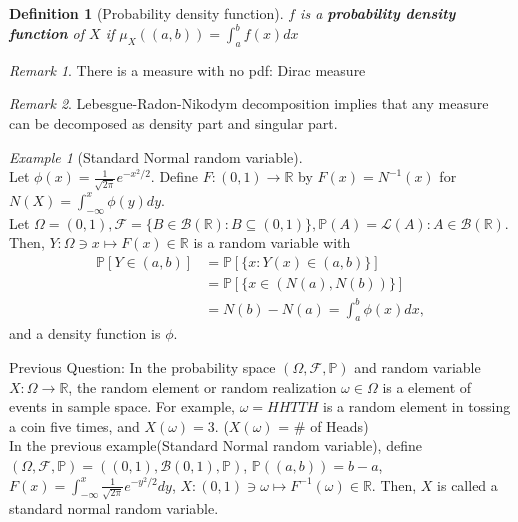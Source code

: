 \documentclass[12pt]{report}
\renewcommand{\subset}{\subseteq}
\theoremstyle{break}
\theoremstyle{newdef}
\newtheorem{defn}[thm]{Definition} %
\theoremstyle{remark}
\newtheorem*{exmp}{Example} %
\newtheorem*{rem}{Remark} %
\begin{document}
\begin{defn}[Probability density function]
$f$ is a \textbf{probability density function} of $X$ if $\mu_X((a,b)) = \int_a^b f(x)dx$
\end{defn}

\begin{rem}
There is a measure with no pdf: Dirac measure
\end{rem}

\begin{rem}
Lebesgue-Radon-Nikodym decomposition implies that any measure can be decomposed as density part and singular part.
\end{rem}

\begin{exmp}[Standard Normal random variable]
\leavevmode\\
Let $\phi(x) = \frac{1}{\sqrt{2\pi}} e^{-x^2/2}$.
Define $F : (0,1) \rightarrow \mathbb{R}$ by $F(x) = N^{-1}(x)$ for $N(X) = \int_{-\infty}^x \phi(y)dy$.\\
Let $\Omega = (0,1), \mathcal{F} = \{B \in \mathcal{B}(\mathbb{R}) : B \subset (0,1)\}, \mathbb{P}(A) = \mathcal{L}(A) : A \in \mathcal{B}(\mathbb{R})$.\\
Then, $Y : \Omega \ni x \mapsto F(x) \in \mathbb{R}$ is a random variable with
$$
\begin{aligned}
\mathbb{P}[Y \in (a,b)]
&= \mathbb{P}[\{x : Y(x) \in (a,b)\}]\\
&= \mathbb{P}[\{x \in (N(a),N(b))\}]\\
&= N(b)-N(a) = \int_a^b \phi(x)dx,
\end{aligned}
$$
and a density function is $\phi$.
\end{exmp}


\vspace{5mm}
Previous Question: In the probability space $(\Omega, \mathcal{F}, \mathbb{P})$ and random variable $X : \Omega \rightarrow \mathbb{R}$, the random element or random realization $\omega \in \Omega$ is a element of events in sample space.
For example, $\omega = HHTTH$ is a random element in tossing a coin five times, and $X(\omega) = 3$. ($X(\omega)$ = \# of Heads)\\
In the previous example(Standard Normal random variable), define $(\Omega, \mathcal{F}, \mathbb{P}) = ((0,1), \mathcal{B}(0,1), \mathbb{P})$, $\mathbb{P}((a,b)) = b-a$, $F(x) = \int_{-\infty}^x \frac{1}{\sqrt{2\pi}}e^{-y^2/2}dy$, $X : (0,1) \ni \omega \mapsto F^{-1}(\omega) \in \mathbb{R}$.
Then, $X$ is called a standard normal random variable.
\end{document}
